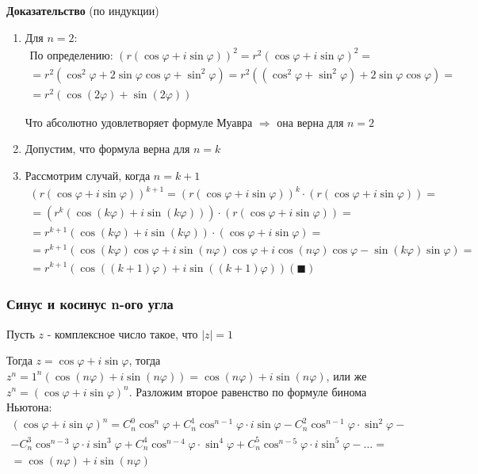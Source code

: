 \documentclass[class=article,a4paper,12pt,crop=false]{standalone}
\begin{document}
\textbf{Доказательство} (по индукции)
\begin{enumerate}
    \item {
        Для $n = 2$:
        \begin{multline}
            \text{По определению: } (r(\cos{\varphi} + i\sin{\varphi}))^2 = r^2(\cos{\varphi} + i\sin{\varphi})^2 =\\
            = r^2(\cos^2\varphi + 2\sin{\varphi}\cos{\varphi} + \sin^2\varphi)
            = r^2((\cos^2\varphi + \sin^2\varphi) + 2\sin{\varphi}\cos{\varphi}) =\\
            = r^2(\cos{(2\varphi)} + \sin{(2\varphi)})
        \end{multline}     
    
        Что абсолютно удовлетворяет формуле Муавра $\Rightarrow$ она верна для $n = 2$
    }
    \item {
        Допустим, что формула верна для $n=k$
    }
    \item {
        Рассмотрим случай, когда $n = k + 1$
        \begin{multline}
            (r(\cos{\varphi} + i\sin{\varphi}))^{k + 1} = 
            (r(\cos{\varphi} + i\sin{\varphi}))^k\cdot (r(\cos{\varphi} + i\sin{\varphi})) = \\ =
            (r^k(\cos{(k\varphi)} + i\sin{(k\varphi)}))\cdot(r(\cos{\varphi} + i\sin{\varphi})) = \\ =
            r^{k + 1}(\cos{(k\varphi)} + i\sin{(k\varphi)})\cdot(\cos{\varphi} + i\sin{\varphi}) =\\
            = r^{k + 1}(\cos{(k\varphi)}\cos{\varphi} + i\sin{(n\varphi)}\cos{\varphi}
            +i\cos{(n\varphi)\cos{\varphi} - \sin{(k\varphi)\sin{\varphi}}}) =\\
            = r^{k + 1}(\cos{((k + 1)\varphi)} + i\sin{((k + 1)\varphi)}) (\blacksquare)
        \end{multline}
    }
\end{enumerate}

\subsubsection{Синус и косинус n-ого угла}

Пусть $z$ - комплексное число такое, что $|z| = 1$

Тогда $z = \cos{\varphi} + i\sin{\varphi}$,
тогда $z^n = 1^n(\cos{(n\varphi)} + i\sin{(n\varphi)}) = \cos{(n\varphi)} + i\sin{(n\varphi)}$,
или же $z^n = (\cos{\varphi} + i\sin{\varphi})^n$. Разложим второе равенство по формуле бинома Ньютона:
\begin{multline}
    (\cos{\varphi} + i\sin{\varphi})^n =
    C_n^0\cos^n\varphi + C_n^1\cos^{n-1}\varphi\cdot{i\sin{\varphi}} - C_n^2\cos^{n-1}\varphi\cdot\sin^2\varphi - \\
    - C_n^3\cos^{n-3}\varphi\cdot{i\sin^3\varphi} + C_n^4\cos^{n-4}\varphi\cdot{\sin^4\varphi} +
    C_n^5\cos^{n-5}\varphi\cdot{i\sin^5\varphi} - \dots = \\
    = \cos{(n\varphi)} + i\sin{(n\varphi)}
\end{multline}
\end{document}
